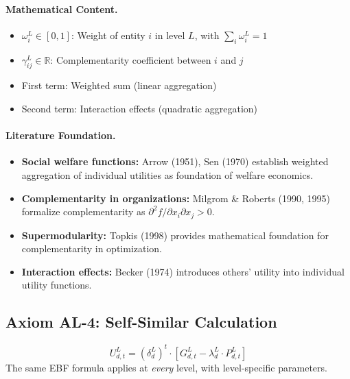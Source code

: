 \paragraph{Mathematical Content.}
\begin{itemize}
\item $\omega^L_i \in [0,1]$: Weight of entity $i$ in level $L$, with $\sum_i \omega^L_i = 1$
\item $\gamma^L_{ij} \in \mathbb{R}$: Complementarity coefficient between $i$ and $j$
\item First term: Weighted sum (linear aggregation)
\item Second term: Interaction effects (quadratic aggregation)
\end{itemize}

\paragraph{Literature Foundation.}
\begin{itemize}
\item \textbf{Social welfare functions:} Arrow (1951), Sen (1970) establish 
weighted aggregation of individual utilities as foundation of welfare economics.
\item \textbf{Complementarity in organizations:} Milgrom \& Roberts (1990, 1995) 
formalize complementarity as $\partial^2 f / \partial x_i \partial x_j > 0$.
\item \textbf{Supermodularity:} Topkis (1998) provides mathematical foundation 
for complementarity in optimization.
\item \textbf{Interaction effects:} Becker (1974) introduces others' utility 
into individual utility functions.
\end{itemize}

\subsection{Axiom AL-4: Self-Similar Calculation}

\begin{tcolorbox}[colback=gray!5!white, colframe=gray!75!black, title=Axiom AL-4: Self-Similarity]
\begin{equation}
\boxed{
U^L_{d,t} = (\delta^L_d)^t \cdot \left[ G^L_{d,t} - \lambda^L_d \cdot P^L_{d,t} \right]
}
\end{equation}
The same EBF formula applies at \emph{every} level, with level-specific parameters.
\end{tcolorbox}

